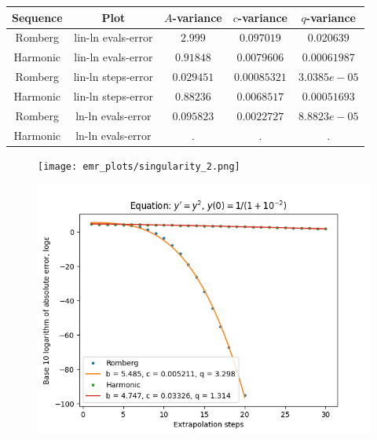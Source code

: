 \begin{table}[H]
    \centering
    \begin{tabular}{c|c||c|c|c}
Sequence & Plot & \(A\)-variance & \(c\)-variance & \(q\)-variance\\\hline
Romberg & lin-ln evals-error & \(2.999\) & \(0.097019\) & \(0.020639\) \\
Harmonic & lin-ln evals-error & \(0.91848\) & \(0.0079606\) & \(0.00061987\) \\
Romberg & lin-ln steps-error & \(0.029451\) & \(0.00085321\) & \(3.0385e-05\) \\
Harmonic & lin-ln steps-error & \(0.88236\) & \(0.0068517\) & \(0.00051693\) \\
Romberg & ln-ln evals-error & \(0.095823\) & \(0.0022727\) & \(8.8823e-05\) \\
Harmonic & ln-ln evals-error & . & . & . \\
    \end{tabular}
    \label{tab:my_label}
\end{table}

\begin{figure}[H]
\centering
\begin{minipage}{0.45\textwidth}
\centering
\texttt{[image: emr\_plots/singularity\_2.png]}
\end{minipage}
\begin{minipage}{0.45\textwidth}
\centering
\includegraphics[scale=0.45]{emr_plots/singularity_2_hp_steps.png}
\end{minipage}
\end{figure}

